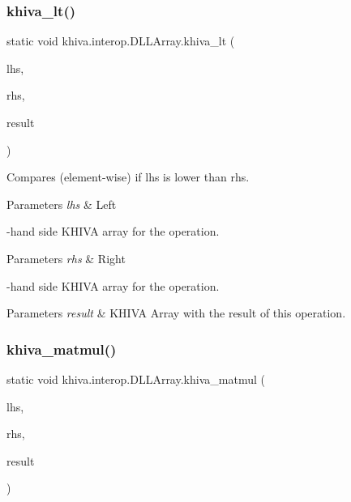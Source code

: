 \subsubsection{\texorpdfstring{khiva\+\_\+lt()}{khiva\_lt()}}
{\footnotesize\ttfamily static void khiva.\+interop.\+D\+L\+L\+Array.\+khiva\+\_\+lt (\begin{DoxyParamCaption}\item[{\mbox{[}\+In\mbox{]} ref Int\+Ptr}]{lhs,  }\item[{\mbox{[}\+In\mbox{]} ref Int\+Ptr}]{rhs,  }\item[{\mbox{[}\+Out\mbox{]} out Int\+Ptr}]{result }\end{DoxyParamCaption})\hspace{0.3cm}{\ttfamily [static]}}



Compares (element-\/wise) if lhs is lower than rhs.


\begin{DoxyParams}{Parameters}
{\em lhs} & Left\\
\hline
\end{DoxyParams}
-\/hand side K\+H\+I\+VA array for the operation. 
\begin{DoxyParams}{Parameters}
{\em rhs} & Right\\
\hline
\end{DoxyParams}
-\/hand side K\+H\+I\+VA array for the operation. 
\begin{DoxyParams}{Parameters}
{\em result} & K\+H\+I\+VA Array with the result of this operation.\\
\hline
\end{DoxyParams}
\mbox{\label{classkhiva_1_1interop_1_1_d_l_l_array_a37e6308ea00012bdea79f3efdc7f1f04}} 
\subsubsection{\texorpdfstring{khiva\+\_\+matmul()}{khiva\_matmul()}}
{\footnotesize\ttfamily static void khiva.\+interop.\+D\+L\+L\+Array.\+khiva\+\_\+matmul (\begin{DoxyParamCaption}\item[{\mbox{[}\+In\mbox{]} ref Int\+Ptr}]{lhs,  }\item[{\mbox{[}\+In\mbox{]} ref Int\+Ptr}]{rhs,  }\item[{\mbox{[}\+Out\mbox{]} out Int\+Ptr}]{result }\end{DoxyParamCaption})\hspace{0.3cm}{\ttfamily [static]}}



